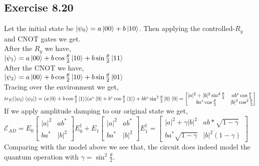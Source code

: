 \documentclass[a4paper,12pt]{article}
\begin{document}
\subsection*{Exercise 8.20}
Let the initial state be $\ket{\psi_0}=a\ket{00}+b\ket{10}$. Then applying the controlled-$R_y$ and CNOT gates we get.\\
After the $R_y$ we have,\\
$\ket{\psi_1}=a\ket{00}+b\cos{\frac{\theta}{2}}\ket{10}+b\sin{\frac{\theta}{2}}\ket{11}$\\
After the CNOT we have,\\
$\ket{\psi_2}=a\ket{00}+b\cos{\frac{\theta}{2}}\ket{10}+b\sin{\frac{\theta}{2}}\ket{01}$\\
Tracing over the environment we get,\\
$tr_E(\ket{\psi_2}\bra{\psi_2})=(a\ket{0}+b\cos{\frac{\theta}{2}}\ket{1})(a^*\bra{0}+b^*\cos{\frac{\theta}{2}}\bra{1})+
bb^*\sin^2{\frac{\theta}{2}}\ket{0}\bra{0}=
\begin{bmatrix}
    |a|^2+|b|^2\sin^2{\frac{\theta}{2}} & ab^*\cos{\frac{\theta}{2}}\\
    ba^*\cos{\frac{\theta}{2}} &    |b|^2\cos^2{\frac{\theta}{2}}
\end{bmatrix}$\\
If we apply amplitude damping to our original state we get,\\
$\mathcal{E}_{AD}=E_0
\begin{bmatrix}
    |a|^2&ab^*\\
    ba^*& |b|^2
\end{bmatrix}
E_0^\dagger +E_1
\begin{bmatrix}
    |a|^2&ab^*\\
    ba^*& |b|^2
\end{bmatrix}
E_1^\dagger=
\begin{bmatrix}
    |a|^2+\gamma|b|^2& ab*\sqrt{1-\gamma}\\
    ba^*\sqrt{1-\gamma} & |b|^2(1-\gamma)
\end{bmatrix}$\\
Comparing with the model above we see that, the circuit does indeed model the quantum operation
with $\gamma=\sin^2{\frac{\theta}{2}}$.
\end{document}
